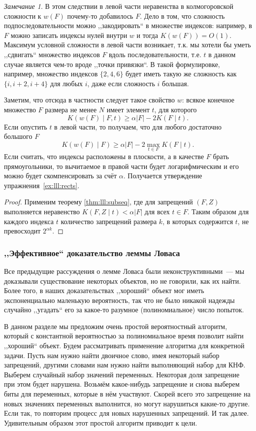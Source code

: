 \documentclass[12pt]{article}
\theoremstyle{definition}
\theoremstyle{plain}
\theoremstyle{remark}
\newtheorem{remark}{Замечание}[section]
\begin{document}
\begin{remark}
В этом следствии в левой части неравенства в колмогоровской сложности к $w(F)$ 
почему-то добавилось $F$. Дело в том, что сложность подпоследовательности 
можно ,,закодировать`` в множестве индексов: например, в $F$ можно записать 
индексы нулей внутри $w$ и тогда $K(w(F)) = O(1)$. Максимум условной сложности 
в левой части возникает, т.к. мы хотели бы уметь ,,сдвигать`` множество индексов $F$
вдоль последовательности, т.е. $t$ в данном случае является чем-то вроде ,,точки привязки``.
В такой формулировке, например, множество индексов $\{2,4,6\}$ будет 
иметь такую же сложность как $\{i, i+2, i+4\}$ для любых $i$, даже если сложность $i$ большая.
\end{remark}

Заметим, что отсюда в частности следует такое свойство $w$: всякое конечное множество $F$
размера не менее $N$ имеет элемент $t$, для которого
\[
    K(w(F) \mid F, t) \ge \alpha |F| - 2K(F\mid t).
\]
Если опустить $t$ в левой части, то получаем, что для любого достаточно большого $F$
\[
K(w(F) \mid F) \ge \alpha |F| - 2\max_{t\in F} K(F\mid t).
\]
Если считать, что индексы расположены в плоскости, а в качестве $F$ брать прямоугольники,
то вычитаемое в правой части будет логарифмическим и его можно будет скомпенсировать за
счёт $\alpha$. Получается утверждение упражнения~\ref{ex:lll:rects}.
\begin{proof}
    Применим теорему \ref{thm:lll:subseq}, где для запрещений $(F,Z)$ выполняется
    неравенство $K(F,Z\mid t) < \alpha|F|$ для всех $t\in F$. Таким образом для
    каждого индекса $t$ количество запрещений размера $k$, в которых содержится $t$,
    не превосходит $2^{\alpha k}$.
\end{proof}

\subsubsection{,,Эффективное`` доказательство леммы Ловаса}
Все предыдущие рассуждения о лемме Ловаса были неконструктивными~--- мы доказывали
существование некоторых объектов, но не говорили, как их найти. Более того,
в наших доказательствах ,,хороший`` объект мог иметь экспоненциально маленькую
вероятность, так что не было никакой надежды случайно ,,угадать`` его за 
какое-то разумное (полиномиальное) число попыток.

В данном разделе мы предложим очень простой вероятностный алгоритм, 
который с константной вероятностью за полиномиальное время позволит найти
,,хороший`` объект. Будем рассматривать применение алгоритма для
конкретной задачи. Пусть нам нужно найти двоичное слово, имея
некоторый набор запрещений, другими словами нам нужно найти
выполняющий набор для КНФ. Выберем случайный набор значений переменных. Некоторая
доля запрещение при этом будет нарушена. Возьмём какое-нибудь
запрещение и снова выберем биты для переменных, которые в нём участвуют.
Скорей всего это запрещение на новых значениях переменных выполнится,
но могут нарушиться какие-то другие. Если так, то повторим процесс
для новых нарушенных запрещений. И так далее. Удивительным образом
этот простой алгоритм приводит к цели.
\end{document}
